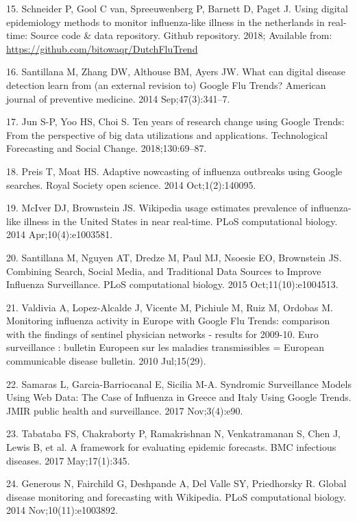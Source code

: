 \documentclass[]{article}
\begin{document}
\leavevmode\hypertarget{ref-repository}{}%
15. Schneider P, Gool C van, Spreeuwenberg P, Barnett D, Paget J. Using
digital epidemiology methods to monitor influenza-like illness in the
netherlands in real-time: Source code \& data repository. Github
repository. 2018; Available from:
\url{https://github.com/bitowaqr/DutchFluTrend}

\leavevmode\hypertarget{ref-Santillana2014}{}%
16. Santillana M, Zhang DW, Althouse BM, Ayers JW. What can digital
disease detection learn from (an external revision to) Google Flu
Trends? American journal of preventive medicine. 2014 Sep;47(3):341--7.

\leavevmode\hypertarget{ref-Jun2018}{}%
17. Jun S-P, Yoo HS, Choi S. Ten years of research change using Google
Trends: From the perspective of big data utilizations and applications.
Technological Forecasting and Social Change. 2018;130:69--87.

\leavevmode\hypertarget{ref-Preis2014}{}%
18. Preis T, Moat HS. Adaptive nowcasting of influenza outbreaks using
Google searches. Royal Society open science. 2014 Oct;1(2):140095.

\leavevmode\hypertarget{ref-McIver2014}{}%
19. McIver DJ, Brownstein JS. Wikipedia usage estimates prevalence of
influenza-like illness in the United States in near real-time. PLoS
computational biology. 2014 Apr;10(4):e1003581.

\leavevmode\hypertarget{ref-Santillana2015}{}%
20. Santillana M, Nguyen AT, Dredze M, Paul MJ, Nsoesie EO, Brownstein
JS. Combining Search, Social Media, and Traditional Data Sources to
Improve Influenza Surveillance. PLoS computational biology. 2015
Oct;11(10):e1004513.

\leavevmode\hypertarget{ref-Valdivia2010}{}%
21. Valdivia A, Lopez-Alcalde J, Vicente M, Pichiule M, Ruiz M, Ordobas
M. Monitoring influenza activity in Europe with Google Flu Trends:
comparison with the findings of sentinel physician networks - results
for 2009-10. Euro surveillance : bulletin Europeen sur les maladies
transmissibles = European communicable disease bulletin. 2010
Jul;15(29).

\leavevmode\hypertarget{ref-Samaras2017}{}%
22. Samaras L, Garcia-Barriocanal E, Sicilia M-A. Syndromic Surveillance
Models Using Web Data: The Case of Influenza in Greece and Italy Using
Google Trends. JMIR public health and surveillance. 2017 Nov;3(4):e90.

\leavevmode\hypertarget{ref-Tabataba2017}{}%
23. Tabataba FS, Chakraborty P, Ramakrishnan N, Venkatramanan S, Chen J,
Lewis B, et al. A framework for evaluating epidemic forecasts. BMC
infectious diseases. 2017 May;17(1):345.

\leavevmode\hypertarget{ref-Generous2014}{}%
24. Generous N, Fairchild G, Deshpande A, Del Valle SY, Priedhorsky R.
Global disease monitoring and forecasting with Wikipedia. PLoS
computational biology. 2014 Nov;10(11):e1003892.
\end{document}
